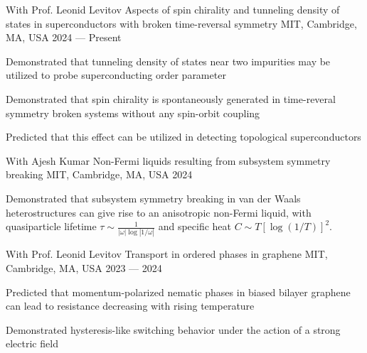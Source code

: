 

\begin{cventries}

\cventry
{With Prof. Leonid Levitov} %
{Aspects of spin chirality and tunneling density of states in superconductors with broken time-reversal symmetry} %
{MIT, Cambridge, MA, USA} %
{2024 --- Present} %
{
	\begin{cvitems} %
		\item{Demonstrated that tunneling density of states near two impurities may be utilized to probe superconducting order parameter}
		\item{Demonstrated that spin chirality is spontaneously generated in time-reveral symmetry broken systems without any spin-orbit coupling}
		\item{Predicted that this effect can be utilized in detecting topological superconductors}
	\end{cvitems}
}

\cventry
{With Ajesh Kumar} %
{Non-Fermi liquids resulting from subsystem symmetry breaking} %
{MIT, Cambridge, MA, USA} %
{2024} %
{
	\begin{cvitems} %
		\item{Demonstrated that subsystem symmetry breaking in van der Waals heterostructures can give rise to an anisotropic non-Fermi liquid, with quasiparticle lifetime $\tau \sim \frac{1}{|\omega|\log|1/\omega|}$ and specific heat $C \sim T [\log(1/T)]^2$.}
	\end{cvitems}
}

\cventry
{With Prof. Leonid Levitov} %
{Transport in ordered phases in graphene} %
{MIT, Cambridge, MA, USA} %
{2023 --- 2024} %
{
	\begin{cvitems} %
		\item{Predicted that momentum-polarized nematic phases in biased bilayer graphene can lead to resistance decreasing with rising temperature}
		\item{Demonstrated hysteresis-like switching behavior under the action of a strong electric field}
	\end{cvitems}
}


\end{cventries}
